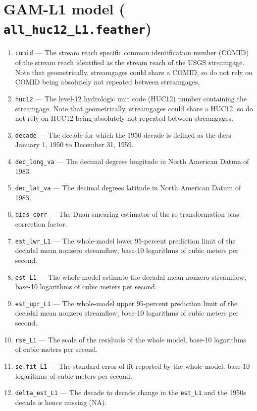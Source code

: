 \documentclass[1p, authoryear, 11pt, times, preprint]{elsarticle}
\newcommand{\code}[1]{{\color{black}%
                       \mbox{\lstinline[basicstyle={\small\ttfamily},
                                        keywordstyle=\scriptsize\ttfamily]|#1|}}}
\begin{document}
 


\section{GAM-L1 model (\code{all_huc12_L1.feather})}
\begin{enumerate}
\footnotesize
\RaggedRight
\item \code{comid} --- The stream reach specific common identification number (COMID) of the stream reach identified as the stream reach of the USGS streamgage. Note that geometrically, streamgages could share a COMID, so do not rely on COMID being absolutely not repeated between streamgages.
\item \code{huc12} --- The level-12 hydrologic unit code (HUC12) number containing the streamgage. Note that geometrically, streamgages could share a HUC12, so do not rely on HUC12 being absolutely not repeated between streamgages.
\item \code{decade} --- The decade for which the 1950 decade is defined as the days January 1, 1950 to December 31, 1959.
\item \code{dec_long_va} --- The decimal degrees longitude in North American Datum of 1983.
\item \code{dec_lat_va} --- The decimal degrees latitude in North American Datum of 1983.
\item \code{bias_corr} --- The Duan smearing estimator of the re-transformation bias correction factor.
\item \code{est_lwr_L1} --- The whole-model lower 95-percent prediction limit of the decadal mean nonzero streamflow, base-10 logarithms of cubic meters per second.
\item \code{est_L1} --- The whole-model estimate the decadal mean nonzero streamflow, base-10 logarithms of cubic meters per second.
\item \code{est_upr_L1} --- The whole-model upper 95-percent prediction limit of the decadal mean nonzero streamflow, base-10 logarithms of cubic meters per second.
\item \code{rse_L1} --- The scale of the residuals of the whole model, base-10 logarithms of cubic meters per second.
\item \code{se.fit_L1} --- The standard error of fit reported by the whole model, base-10 logarithms of cubic meters per second.
\item \code{delta_est_L1} --- The decade to decade change in the \code{est_L1} and the 1950s decade is hence missing (NA).
\end{enumerate}
\end{document}
